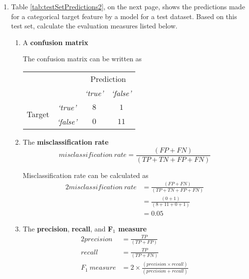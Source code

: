 \documentclass[solution]{ditpaper}
\newcommand{\featL}[1]{\textit{`#1'}}
\begin{document}
\begin{enumerate}
\item Table \ref{tab:testSetPredictions2}, on the next page, shows the predictions made for a categorical target feature by a model for a test dataset. Based on this test set, calculate the evaluation measures listed below.
\begin{enumerate} 
\item A \textbf{confusion matrix}
\begin{answer}
The confusion matrix can be written as
\vspace{1em}
\noindent\begin{scriptsize}
\begin{tabular}{c c c  c }
    & &  \multicolumn{2}{c}{Prediction} \\
  & &  \featL{true} &  \featL{false} \\
  \hline
  \multirow{2}{*}{\parbox{1.1cm}{\raggedleft Target}}  & \featL{true} & $8$	&	$1$ \\
  & \featL{false} & $0$	&	$11$ 
\end{tabular}
\end{scriptsize}
\vspace{1em}
\end{answer}
\item The \textbf{misclassification rate}
\begin{equation*}
misclassification~rate = \frac{\left(FP + FN\right)}{\left(TP + TN + FP + FN\right)} 
\end{equation*}
\begin{answer}
Misclassification rate can be calculated as
\begin{alignat*}{2}
misclassification~rate & = \frac{\left(FP + FN\right)}{\left(TP + TN + FP + FN\right)} \\
 & = \frac{\left(0 + 1\right)}{\left(8 + 11 + 0 + 1\right)} \\ 
 & = 0.05
\end{alignat*}
\end{answer}
\item The \textbf{precision}, \textbf{recall}, and \textbf{F$_1$ measure}
\begin{alignat*}{2}
precision & = \frac{TP}{\left(TP + FP\right)} \\
recall & = \frac{TP}{\left(TP + FN\right)} \\
F_1~measure & = 2 \times \frac{\left(precision \times recall \right)}{\left(precision + recall\right)} \\
\end{alignat*}
\begin{answer}

\end{answer}
\end{enumerate}
\end{enumerate}
\end{document}
